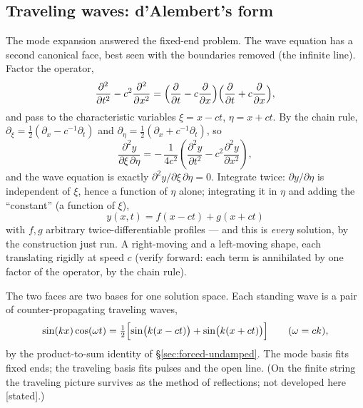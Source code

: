 \documentclass[11pt]{article}
\theoremstyle{plain}
\theoremstyle{definition}
\theoremstyle{remark}
\begin{document}
\subsection{Traveling waves: d'Alembert's form}
\label{sec:dalembert}

The mode expansion answered the fixed-end problem. The wave equation
has a second canonical face, best seen with the boundaries removed
(the infinite line). Factor the operator,
\begin{equation}
  \frac{\partial^2}{\partial t^2} - c^2\frac{\partial^2}{\partial x^2}
  = \Bigl(\frac{\partial}{\partial t} - c\frac{\partial}{\partial x}\Bigr)
    \Bigl(\frac{\partial}{\partial t} + c\frac{\partial}{\partial x}\Bigr),
\end{equation}
and pass to the characteristic variables $\xi = x - ct$,
$\eta = x + ct$. By the chain rule,
$\partial_\xi = \tfrac12(\partial_x - c^{-1}\partial_t)$ and
$\partial_\eta = \tfrac12(\partial_x + c^{-1}\partial_t)$, so
\begin{equation}
  \frac{\partial^2 y}{\partial \xi\,\partial\eta}
  = -\,\frac{1}{4c^2}
  \left(\frac{\partial^2 y}{\partial t^2}
  - c^2\frac{\partial^2 y}{\partial x^2}\right),
\end{equation}
and the wave equation is exactly
$\partial^2 y/\partial\xi\,\partial\eta = 0$. Integrate twice:
$\partial y/\partial\eta$ is independent of $\xi$, hence a function of
$\eta$ alone; integrating it in $\eta$ and adding the ``constant'' (a
function of $\xi$),
\begin{equation}
  \boxed{\;
  y(x,t) = f(x - ct) + g(x + ct)
  \;}
\end{equation}
with $f, g$ arbitrary twice-differentiable profiles --- and this is
\emph{every} solution, by the construction just run. A right-moving
and a left-moving shape, each translating rigidly at speed $c$
(verify forward: each term is annihilated by one factor of the
operator, by the chain rule).

The two faces are two bases for one solution space. Each standing
wave is a pair of counter-propagating traveling waves,
\begin{equation}
  \sin(kx)\cos(\omega t)
  = \tfrac12\Bigl[\sin\bigl(k(x - ct)\bigr)
  + \sin\bigl(k(x + ct)\bigr)\Bigr]
  \qquad (\omega = ck),
\end{equation}
by the product-to-sum identity of \S\ref{sec:forced-undamped}. The
mode basis fits fixed ends; the traveling basis fits pulses and the
open line. (On the finite string the traveling picture survives as
the method of reflections; not developed here [stated].)
\end{document}
